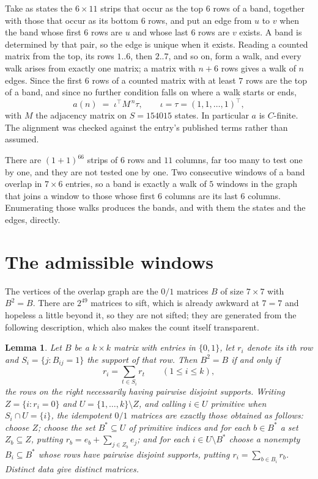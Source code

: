 \documentclass[11pt,a4paper]{article}
\theoremstyle{plain}
\newtheorem{lemma}[theorem]{Lemma}
\theoremstyle{definition}
\begin{document}
Take as states the $6\times11$ strips that occur as the top $6$ rows of a band,
together with those that occur as its bottom $6$ rows, and put an edge from $u$ to $v$
when the band whose first $6$ rows are $u$ and whose last $6$ rows are $v$ exists.
A band is determined by that pair, so the edge is unique when it exists. Reading a counted
matrix from the top, its rows $1..6$, then $2..7$, and so on, form a walk, and every
walk arises from exactly one matrix; a matrix with $n+6$ rows gives a walk of $n$ edges.
Since the first $6$ rows of a counted matrix with at least $7$ rows are the top of a
band, and since no further condition falls on where a walk starts or ends,
\[
a(n)\;=\;\iota^{\!\top}M^{\,n}\tau ,\qquad \iota=\tau=(1,1,\dots,1)^{\!\top},
\]
with $M$ the adjacency matrix on $S=154015$ states. In particular $a$ is $C$-finite. The
alignment was checked against the entry's published terms rather than assumed.

There are $(1 + 1)^{66}$ strips of $6$ rows and $11$ columns, far too
many to test one by one, and they are not tested one by one. Two consecutive windows of a band
overlap in $7\times6$ entries, so a band is exactly a walk of $5$ windows in
the graph that joins a window to those whose first $6$ columns are its last $6$
columns. Enumerating those walks produces the bands, and with them the states and the edges,
directly.

\section{The admissible windows}

The vertices of the overlap graph are the $0/1$ matrices $B$ of size $7\times7$ with
$B^2=B$. There are $2^{49}$ matrices to sift, which is already awkward at $7=7$ and
hopeless a little beyond it, so they are not sifted; they are generated from the following
description, which also makes the count itself transparent.

\begin{lemma}\label{lem:idem}
Let $B$ be a $k\times k$ matrix with entries in $\{0,1\}$, let $r_i$ denote its $i$th row and
$S_i=\{j:B_{ij}=1\}$ the support of that row. Then $B^2=B$ if and only if
\[
r_i=\sum_{t\in S_i}r_t \qquad (1\le i\le k),
\]
the rows on the right necessarily having pairwise disjoint supports. Writing
$Z=\{i:r_i=0\}$ and $U=\{1,\dots,k\}\setminus Z$, and calling $i\in U$ \emph{primitive}
when $S_i\cap U=\{i\}$, the idempotent $0/1$ matrices are exactly those obtained as follows:
choose $Z$; choose the set $B^{\ast}\subseteq U$ of primitive indices and for each
$b\in B^{\ast}$ a set $Z_b\subseteq Z$, putting $r_b=e_b+\sum_{j\in Z_b}e_j$; and for each
$i\in U\setminus B^{\ast}$ choose a nonempty $B_i\subseteq B^{\ast}$ whose rows have
pairwise disjoint supports, putting $r_i=\sum_{b\in B_i}r_b$. Distinct data give distinct
matrices.
\end{lemma}
\end{document}
